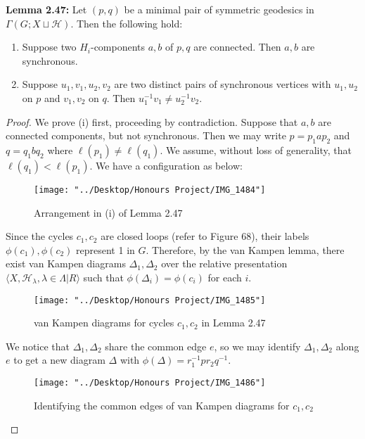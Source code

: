 \documentclass[12pt]{article}
\newcommand{\vs}{\vskip10pt}
\begin{document}
	\vs 
	
	\textbf{Lemma 2.47: } Let $(p,q)$ be a minimal pair of symmetric geodesics in $\Gamma(G; X \sqcup \mathcal{H})$. Then the following hold: 
	
	\begin{enumerate}[label = (\roman*)]
		\item Suppose two $H_i$-components $a,b$ of $p,q$ are connected. Then $a,b$ are synchronous. 
		\item Suppose $u_1, v_1, u_2, v_2$ are two distinct pairs of synchronous vertices with $u_1, u_2$ on $p$ and $v_1, v_2$ on $q$. Then $u_1^{-1}v_1 \neq u_2^{-1}v_2$.
	\end{enumerate}

	\begin{proof}
		
		We prove (i) first, proceeding by contradiction. Suppose that $a,b$ are connected components, but not synchronous. Then we may write $p = p_1 a p_2$ and $q = q_1 b q_2$ where $\ell(p_1) \neq \ell(q_1)$. We assume, without loss of generality, that $\ell(q_1) < \ell(p_1)$. We have a configuration as below: 
		
\begin{figure} [H]
	\centering
	\texttt{[image: "../Desktop/Honours Project/IMG\_1484"]}
	\caption{Arrangement in (i) of Lemma 2.47}
	\label{fig:img1484}
\end{figure}
		
		\vs
		
		Since the cycles $c_1, c_2$ are closed loops (refer to Figure 68), their labels $\phi(c_1), \phi(c_2)$ represent 1 in $G$. Therefore, by the van Kampen lemma, there exist van Kampen diagrams $\Delta_1, \Delta_2$ over the relative presentation $\langle X, \mathcal{H}_{\lambda}, \lambda \in \Lambda \vert R \rangle$ such that $\phi(\Delta_i) = \phi(c_i)$ for each $i$. 
		
		\vs 
		
\begin{figure} [H]
	\centering
	\texttt{[image: "../Desktop/Honours Project/IMG\_1485"]}
	\caption{van Kampen diagrams for cycles $c_1, c_2$ in Lemma 2.47}
	\label{fig:img1485}
\end{figure}
		
		We notice that $\Delta_1, \Delta_2$ share the common edge $e$, so we may identify $\Delta_1, \Delta_2$ along $e$ to get a new diagram $\Delta$ with $\phi(\Delta) = r_1^{-1} p r_2 q^{-1}$. 
		
\begin{figure} [H]
	\centering
	\texttt{[image: "../Desktop/Honours Project/IMG\_1486"]}
	\caption{Identifying the common edges of van Kampen diagrams for $c_1, c_2$}
	\label{fig:img1486}
\end{figure}
		

\end{proof}
\end{document}
